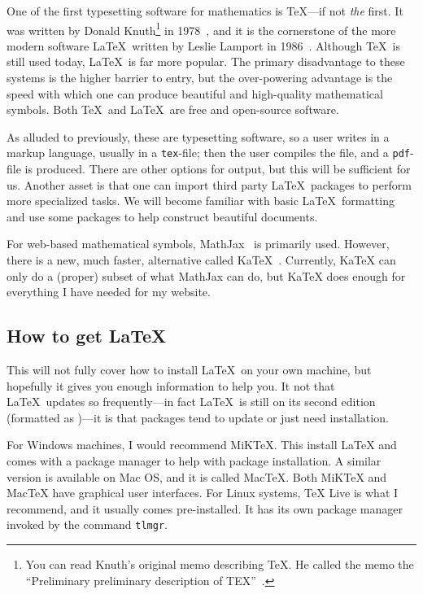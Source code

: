 \documentclass[a4paper, 12pt]{article}
\numberwithin{equation}{section}
\numberwithin{figure}{section}
\theoremstyle{definition}
\begin{document}
One of the first typesetting software for mathematics is \TeX---if not
\textit{the} first. It was written by Donald Knuth\footnote{You can read Knuth's
original memo describing \TeX. He called the memo the ``Preliminary preliminary
description of TEX''~\cite{TeX-draft}.} in 1978~\cite{Knuth-Quanta}, and it is
the cornerstone of the more modern software \LaTeX\ written by Leslie Lamport in
1986~\cite{Lamport}. Although \TeX\ is still used today, \LaTeX\ is far more
popular. The primary disadvantage to these systems is the higher barrier to
entry, but the over-powering advantage is the speed with which one can produce
beautiful and high-quality mathematical symbols. Both \TeX\ and \LaTeX\ are free
and open-source software. 

As alluded to previously, these are typesetting software, so a user writes in a
markup language, usually in a \texttt{tex}-file; then the user compiles the
file, and a \texttt{pdf}-file is produced. There are other options for output,
but this will be sufficient for us. Another asset is that one can import third
party \LaTeX\ packages to perform more specialized tasks. We will become
familiar with basic \LaTeX\ formatting and use some packages to help construct
beautiful documents. 

For web-based mathematical symbols, MathJax~\cite{MathJax} is primarily used.
However, there is a new, much faster, alternative called KaTeX~\cite{KaTeX}.
Currently, KaTeX can only do a (proper) subset of what MathJax can do, but KaTeX
does enough for everything I have needed for my website. 

\subsection{How to get \LaTeX}

This will not fully cover how to install \LaTeX\ on your own machine, but
hopefully it gives you enough information to help you. It not that \LaTeX\
updates so frequently---in fact \LaTeX\ is still on its second edition
(formatted as \LaTeXe)---it is that packages tend to update or just need
installation. 

For Windows machines, I would recommend MiKTeX. This install LaTeX and comes
with a package manager to help with package installation. A similar version is
available on Mac OS, and it is called MacTeX. Both MiKTeX and MacTeX have
graphical user interfaces. For Linux systems, TeX Live is what I recommend, and
it usually comes pre-installed. It has its own package manager invoked by the
command \texttt{tlmgr}. 
\end{document}
